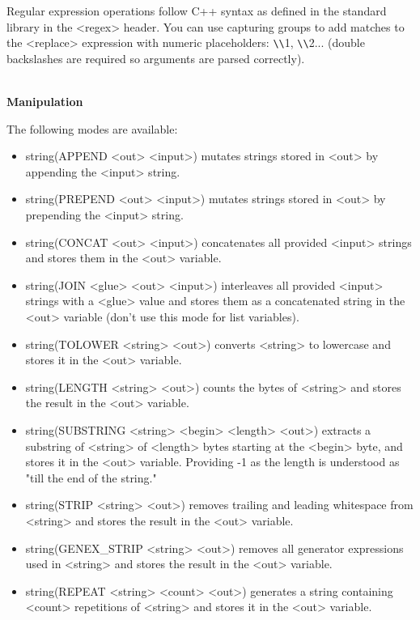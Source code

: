 Regular expression operations follow C++ syntax as defined in the standard library in the <regex> header. You can use capturing groups to add matches to the <replace> expression with numeric placeholders: \verb|\|\verb|\|1, \verb|\|\verb|\|2... (double backslashes are required so arguments are parsed correctly).

\hspace*{\fill} \\ %
\noindent
\textbf{Manipulation}

The following modes are available:

\begin{itemize}
\item 
string(APPEND <out> <input>) mutates strings stored in <out> by appending the <input> string.

\item 
string(PREPEND <out> <input>) mutates strings stored in <out> by prepending the <input> string.

\item 
string(CONCAT <out> <input>) concatenates all provided <input> strings and stores them in the <out> variable.

\item 
string(JOIN <glue> <out> <input>) interleaves all provided <input> strings with a <glue> value and stores them as a concatenated string in the <out> variable (don't use this mode for list variables).

\item
string(TOLOWER <string> <out>) converts <string> to lowercase and stores it in the <out> variable.

\item
string(LENGTH <string> <out>) counts the bytes of <string> and stores the result in the <out> variable.

\item
string(SUBSTRING <string> <begin> <length> <out>) extracts a substring of <string> of <length> bytes starting at the <begin> byte, and stores it in the <out> variable. Providing -1 as the length is understood as "till the end of the string."

\item
string(STRIP <string> <out>) removes trailing and leading whitespace from <string> and stores the result in the <out> variable.

\item 
string(GENEX\_STRIP <string> <out>) removes all generator expressions used in <string> and stores the result in the <out> variable.

\item 
string(REPEAT <string> <count> <out>) generates a string containing <count> repetitions of <string> and stores it in the <out> variable.
\end{itemize}


